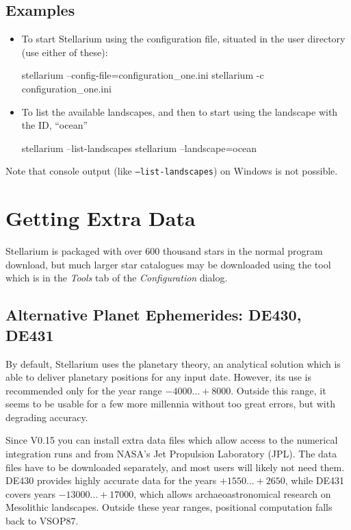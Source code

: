 \section{Examples}\label{examples}
\label{sec:CommandLineOptions:Examples}

\begin{itemize}
\item To start Stellarium using the configuration file,
   situated in the user directory (use either of
  these):

\begin{commands}
stellarium --config-file=configuration_one.ini
stellarium -c configuration_one.ini
\end{commands}

\item To list the available landscapes, and then to start using the
  landscape with the ID, ``ocean''
\begin{commands}
stellarium --list-landscapes 
stellarium --landscape=ocean
\end{commands}
\end{itemize}

\noindent Note that console output (like \texttt{--list-landscapes}) on Windows is not possible. 

\chapter{Getting Extra Data}\label{getting-extra-star-data}

Stellarium is packaged with over 600 thousand stars in the normal
program download, but much larger star catalogues may be downloaded
using the tool which is in the \emph{Tools} tab of the
\emph{Configuration} dialog.


\section{Alternative Planet Ephemerides: DE430, DE431}
\label{sec:ExtraData:ephemerides}

By default, Stellarium uses the  planetary theory,
an analytical solution which is able to deliver planetary positions
for any input date. However, its use is recommended only for the year
range $-4000\ldots+8000$. Outside this range, it seems to be usable
for a few more millennia without too great errors, but with degrading accuracy. 

Since V0.15 you can install extra data files which allow access to the
numerical integration runs  and 
from NASA's Jet Propulsion Laboratory (JPL). The data files have to be
downloaded separately, and most users will likely not need them. DE430
provides highly accurate data for the years $+1550\ldots+2650$, while
DE431 covers years $-13000\ldots+17000$, which allows
archaeoastronomical research on Mesolithic landscapes. Outside these
year ranges, positional computation falls back to VSOP87.

